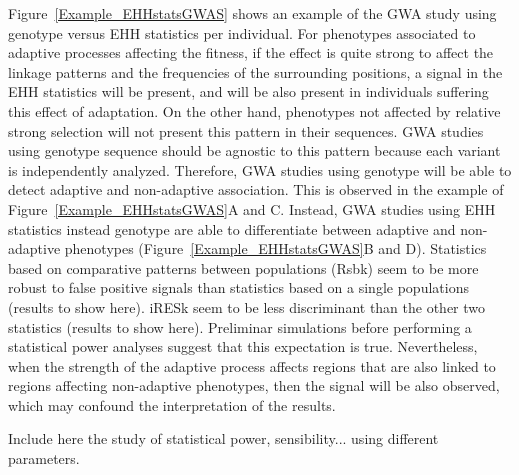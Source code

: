 \documentclass[a4paper,11pt]{article}
\begin{document}
Figure~\ref{Example_EHHstatsGWAS} shows an example of the GWA study using genotype versus EHH statistics per individual. For phenotypes associated to adaptive processes affecting the fitness, if the effect is quite strong to affect the linkage patterns and the frequencies of the surrounding positions, a signal in the EHH statistics will be present, and will be also present in individuals suffering this effect of adaptation. On the other hand, phenotypes not affected by relative strong selection will not present this pattern in their sequences. GWA studies using genotype sequence should be agnostic to this pattern because each variant is independently analyzed. Therefore, GWA studies using genotype will be able to detect adaptive and non-adaptive association. This is observed in the example of Figure~\ref{Example_EHHstatsGWAS}A and C. Instead, GWA studies using EHH statistics instead genotype are able to differentiate between adaptive and non-adaptive phenotypes (Figure~\ref{Example_EHHstatsGWAS}B and D). Statistics based on comparative patterns between populations (Rsbk) seem to be more robust to false positive signals than statistics based on a single populations (results to show here). iRESk seem to be less discriminant than the other two statistics  (results to show here). Preliminar simulations before performing a statistical power analyses suggest that this expectation is true. Nevertheless, when the strength of the adaptive process affects regions that are also linked to regions affecting non-adaptive phenotypes, then the signal will be also observed, which may confound the interpretation of the results.

Include here the study of statistical power, sensibility... using different parameters.

\end{document}
